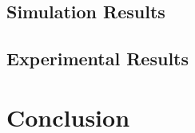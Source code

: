 \documentclass[journal]{IEEEtran}
\begin{document}
\subsection{Simulation Results}
\subsection{Experimental Results}
\section{Conclusion}



\end{document}
